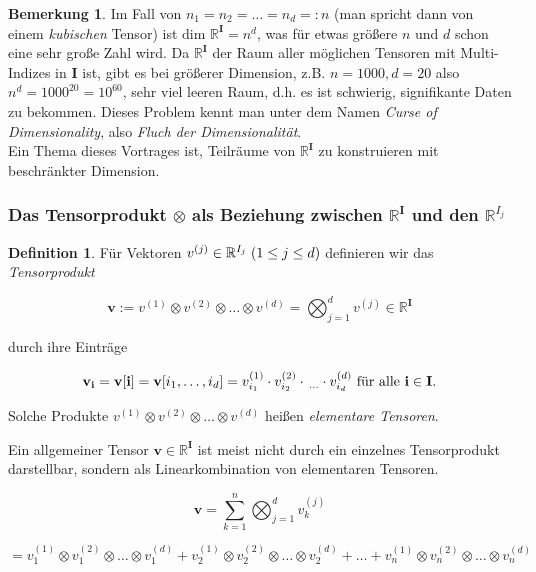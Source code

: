 \documentclass[11pt]{article} %
\theoremstyle{definition}
\newtheorem{definition}[thm]{Definition}
\newtheorem{rmk}[thm]{Bemerkung}
\numberwithin{equation}{section}
\begin{document}
\begin{changemargin}{0pt}{0pt}
\begin{rmk}
Im Fall von $n_{1} = n_{2} = \dots = n_{d} =: n$ (man spricht dann von einem \textit{kubischen} Tensor) ist
$\text{dim } \mathbb{R}^{\mathbf{I}} = n^{d}$, was für etwas größere $n$ und $d$ schon
eine sehr große Zahl wird. Da $\mathbb{R}^{\mathbf{I}}$ der Raum aller möglichen Tensoren mit Multi-Indizes in $\mathbf{I}$ ist, gibt es bei
größerer Dimension, z.B. $n = 1000, d = 20$ also $n^{d} = 1000^{20} = 10^{60}$, sehr viel leeren Raum, d.h. es ist schwierig, signifikante Daten zu
bekommen. Dieses Problem kennt man unter dem Namen \textit{Curse of Dimensionality}, also \textit{Fluch der Dimensionalität}.\\
Ein Thema dieses Vortrages ist, Teilräume von $\mathbb{R}^{\mathbf{I}}$ zu konstruieren mit beschränkter Dimension.
\end{rmk}
\end{changemargin}

\newpage
\subsubsection{Das Tensorprodukt $\otimes$ als Beziehung zwischen $\mathbb{R}^{\mathbf{I}}$ und den $\mathbb{R}^{I_{j}}$}
\begin{changemargin}{0pt}{0pt}

\begin{definition}
Für Vektoren $v^{(j)} \in \mathbb{R}^{I_{j}} \hspace{1mm}(1 \leq j \leq d)$ definieren wir das \textit{Tensorprodukt}

\[\mathbf{v} := v^{(1)} \otimes v^{(2)} \otimes \dots \otimes v^{(d)} = \bigotimes^{d}_{j=1} v^{(j)} \in \mathbb{R}^{\mathbf{I}}\]

durch ihre Einträge

\begin{equation} \label{eq:1.2}
\mathbf{v}_{\mathbf{i}} = \mathbf{v}[\mathbf{i}] = \mathbf{v}[i_{1},\dots,i_{d}] 
= v^{(1)}_{i_{1}} \cdot  v^{(2)}_{i_{2}} \cdot \hspace{0.5mm}_{\dots} \cdot  v^{(d)}_{i_{d}} \text{ für alle } \mathbf{i} \in \mathbf{I}.
\end{equation}

Solche Produkte $v^{(1)} \otimes v^{(2)} \otimes \dots \otimes v^{(d)}$ heißen \textit{elementare Tensoren}.
\end{definition}

Ein allgemeiner Tensor $\mathbf{v} \in \mathbb{R}^{\mathbf{I}}$ ist meist nicht durch ein einzelnes Tensorprodukt darstellbar,
sondern als Linearkombination von elementaren Tensoren.

\[ \mathbf{v} = \sum_{k=1}^{n} \bigotimes_{j=1}^{d} v^{(j)}_{k}\]

\[= v_{1}^{(1)} \otimes v_{1}^{(2)} \otimes \dots \otimes v_{1}^{(d)} + v_{2}^{(1)} \otimes v_{2}^{(2)} \otimes
\dots \otimes v_{2}^{(d)} +\dots
+v_{n}^{(1)} \otimes v_{n}^{(2)} \otimes \dots \otimes v_{n}^{(d)}  \]

\end{changemargin}
\end{document}
